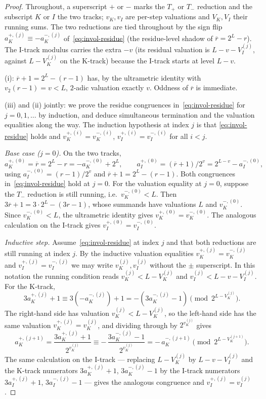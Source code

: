 \documentclass[11pt,reqno]{amsart}
\newcommand{\Tplus}{T_{+}}
\newcommand{\Tminus}{T_{-}}
\newcommand{\Vk}{V_{K}}
\newcommand{\Vi}{V_{I}}
\newcommand{\vk}{v_{K}}
\newcommand{\vi}{v_{I}}
\newcommand{\vtwo}{v_{2}}
\begin{document}
\begin{proof}
Throughout, a superscript $+$ or $-$ marks the $\Tplus$ or $\Tminus$ reduction
and the subscript $K$ or $I$ the two tracks; $\vk, \vi$ are per-step valuations
and $\Vk, \Vi$ their running sums. The two reductions are tied throughout by the
sign flip $a_K^{+,(j)} \equiv -a_K^{-,(j)}$ of~\eqref{eq:invol-residue} (the
residue-level shadow of $\overline{r} = 2^L - r$). The I-track modulus carries
the extra $-v$
(its residual valuation is $L - v - \Vi^{(j)}$, against $L - \Vk^{(j)}$ on the
K-track) because the I-track starts at level $L - v$.

(i): $\overline{r} + 1 = 2^L - (r - 1)$ has, by the ultrametric identity
with $\vtwo(r-1) = v < L$, $2$-adic valuation exactly $v$. Oddness of
$\overline{r}$ is immediate.

(iii) and (ii) jointly: we prove the residue congruences
in~\eqref{eq:invol-residue} for $j = 0, 1, \ldots$ by induction, and
deduce simultaneous termination and the valuation equalities along the
way. The induction hypothesis at index $j$ is that \eqref{eq:invol-residue}
holds and $\vk^{+,(i)} = \vk^{-,(i)}$, $\vi^{+,(i)} = \vi^{-,(i)}$ for all
$i < j$.

\emph{Base case ($j = 0$).} On the two tracks,
\[
a_K^{+,(0)} = \overline{r} = 2^L - r = -a_K^{-,(0)} + 2^L, \qquad
a_I^{+,(0)} = (\overline{r}+1)/2^v = 2^{L-v} - a_I^{-,(0)},
\]
using $a_I^{-,(0)} = (r-1)/2^v$ and $\overline{r}+1 = 2^L - (r-1)$. Both
congruences in~\eqref{eq:invol-residue} hold at $j = 0$. For the
valuation equality at $j = 0$, suppose the $\Tminus$ reduction is still
running, i.e.\ $\vk^{-,(0)} < L$. Then
$3 \overline{r} + 1 = 3 \cdot 2^L - (3 r - 1)$, whose summands have
valuations $L$ and $\vk^{-,(0)}$. Since $\vk^{-,(0)} < L$,
the ultrametric identity gives $\vk^{+,(0)} = \vk^{-,(0)}$. The
analogous calculation on the I-track gives $\vi^{+,(0)} = \vi^{-,(0)}$.

\emph{Inductive step.} Assume~\eqref{eq:invol-residue} at index $j$ and
that both reductions are still running at index $j$. By the inductive
valuation equalities $\vk^{+,(j)} = \vk^{-,(j)}$ and
$\vi^{+,(j)} = \vi^{-,(j)}$ we may write $\vk^{(j)}, \vi^{(j)}$ without the
$\pm$ superscript. In this notation the running condition reads
$\vk^{(j)} < L - \Vk^{(j)}$ and $\vi^{(j)} < L - v - \Vi^{(j)}$. For the
K-track,
\[
3 a_K^{+,(j)} + 1 \equiv 3 (-a_K^{-,(j)}) + 1 = -(3 a_K^{-,(j)} - 1)
\pmod{2^{L - \Vk^{(j)}}}.
\]
The right-hand side has valuation $\vk^{(j)} < L - \Vk^{(j)}$, so the
left-hand side has the same valuation $\vk^{+,(j)} = \vk^{(j)}$, and
dividing through by $2^{\vk^{(j)}}$ gives
\[
a_K^{+,(j+1)} = \frac{3 a_K^{+,(j)} + 1}{2^{\vk^{(j)}}}
\equiv -\, \frac{3 a_K^{-,(j)} - 1}{2^{\vk^{(j)}}}
= -\, a_K^{-,(j+1)}
\pmod{2^{L - \Vk^{(j+1)}}}.
\]
The same calculation on the I-track --- replacing $L - \Vk^{(j)}$ by
$L - v - \Vi^{(j)}$ and the K-track numerators $3 a_K^{+,(j)} + 1$,
$3 a_K^{-,(j)} - 1$ by the I-track numerators $3 a_I^{+,(j)} + 1$,
$3 a_I^{-,(j)} - 1$ --- gives the analogous congruence and
$\vi^{+,(j)} = \vi^{(j)}$.


\end{proof}
\end{document}
